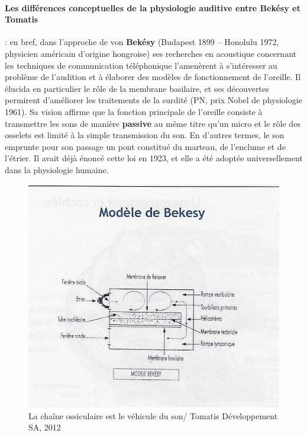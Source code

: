 \paragraph{Les différences conceptuelles de la physiologie auditive
  entre Bekésy et Tomatis}: en bref, dans  l'approche de von \textbf{ Bekésy} (Budapest 1899 -- Honolulu 
  1972,
physicien américain d'origine hongroise) ses
recherches en acoustique concernant les techniques de communication
téléphonique l'amenèrent à s'intéresser au problème de l'audition et à
élaborer des modèles de fonctionnement de l'oreille. Il élucida en
particulier le rôle de la membrane basilaire, et ses découvertes
permirent d'améliorer les traitements de la surdité (PN, prix
Nobel de physiologie 1961).
Sa vision affirme que la fonction principale de l'oreille 
consiste à transmettre les sons de manière \textbf{passive} au même titre qu'un micro et le rôle des 
osselets
est limité à la simple transmission du
son. En d'autres termes, le son emprunte pour son passage un pont  constitué du marteau, de l'enclume 
et de l'étrier. Il avait déjà énoncé cette loi en 1923, et elle a été adoptée
universellement dans la physiologie humaine.
\begin{figure}
	\centering
	\includegraphics[width=0.7\linewidth]{images/Cochleederoule_bas.jpg}
	\caption[Modèle de Békésy]{La chaîne ossiculaire est le véhicule du son/ 
		Tomatis Développement SA, 2012}
	\label{fig:cochleederoulebas}
\end{figure}



